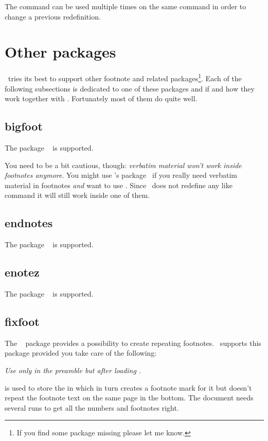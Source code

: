 \documentclass{fnpct-manual}
\begin{document}
The command  can be used multiple times on the same command in
order to change a previous redefinition.

\section{Other packages}\label{sec:other:packages}
\fnpct\ tries its best to support other footnote and related
packages\footnote{If you find some package missing please let me know.}.  Each
of the following subsections is dedicated to one of these packages and if and
how they work together with \fnpct.  Fortunately most of them do quite well.

\subsection{bigfoot}\label{sec:bigfoot}
The package ~\cite{pkg:bigfoot} is supported.

You need to be a bit cautious, though: \emph{verbatim material won't work
  inside footnotes anymore}.  You might use \lefloch's 
package~\cite{pkg:cprotect} if you really need verbatim material in footnotes
\emph{and} want to use \fnpct.  Since \fnpct\ does not redefine any
 like command it will still work inside one of them.

\subsection{endnotes}\label{sec:endnotes}
The package ~\cite{pkg:endnotes} is supported.

\subsection{enotez}\label{sec:enotez}
The package ~\cite{pkg:enotez} is supported.

\subsection{fixfoot}\label{sec:fixfoot}
The ~\cite{pkg:fixfoot} package provides a possibility to create
repeating footnotes.  \fnpct\ supports this package provided you take care of
the following:

\emph{Use  only in the preamble but \emph{after}
  loading \fnpct.}

 is used to store
the  in  which in turn creates a footnote mark for
it but doesn't repeat the footnote text on the same page in the bottom.  The
document needs several runs to get all the numbers and footnotes right.
\end{document}
